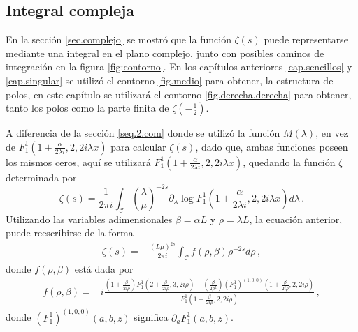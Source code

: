 \subsection{Integral compleja}\label{sec.finita.compleja}

En la sección \ref{sec.complejo} se mostró que la función $\zeta (s)$ puede representarse mediante una integral en el plano complejo, junto con posibles caminos de integración en la figura \ref{fig:contorno}. En los capítulos anteriores \ref{cap.sencillos}  y \ref{cap.singular} se utilizó el contorno \ref{fig.medio} para obtener, la estructura de polos, en este capítulo se utilizará el contorno \ref{fig.derecha.derecha} para obtener, tanto los polos como la parte finita  de  $\zeta \left( - \frac{1}{2} \right)$.

A diferencia de la sección \ref{seq.2.com} donde se utilizó la función $M (\lambda )$, en vez de $F _1 ^{1} \left( 1+\frac{ \alpha}{2 \lambda i },2,2 i \lambda x \right)$ para calcular $\zeta (s)$, dado que, ambas funciones poseen los mismos ceros, aquí se utilizará 
$F _1 ^{1} \left( 1+\frac{ \alpha}{2 \lambda i },2,2 i \lambda x \right)$, quedando la función $\zeta$ determinada por
\begin{equation}
	\zeta (s) = 
	\frac{1}{2 \pi i} \int _{\mathcal{C}} 
						\left( \frac{\lambda}{\mu} \right) ^{-2s}
						\partial _ \lambda 
						\log F _1 ^{1} 
						\left( 1+\frac{ \alpha}{2 \lambda i },
							2,2 i \lambda x 
							\right)												
						d \lambda
	\, .
\end{equation}
Utilizando las variables adimensionales $\beta = \alpha L$ y  $\rho = \lambda L$, la ecuación anterior, puede reescribirse de la forma
\begin{align}
\label{eq.ultima.int}
	\zeta (s) =& 
	\frac{\left(L \mu \right)^{2s}}{2 \pi i} \int _{\mathcal{C}} 
	f (\rho , \beta) \rho ^{-2s} d \rho 
\, ,
\end{align}
donde $f( \rho, \beta)$ está dada por
\begin{align}
f(\rho, \beta) =& 	
i
\frac{
		\left(1 + \frac{ \beta}{2 i \rho} \right) 
		F _1 ^1 
			\left( 2 + \frac{ \beta}{2 i \rho} ,3 ,2 i \rho \right)
		+ \left( \frac{\beta				
				}
				{2 \rho ^2 } 
				\right)
				( F _{1} ^1 ) ^{(1,0,0)}
				\left( 1 + \frac{\beta}{2 i \rho} ,2 ,2 i \rho
						\right)
		}
		{F _1 ^1 \left( 1 + \frac{\beta}{2 i \rho},2,2 i \rho \right)} 
\, ,	
\nonumber
\end{align}
donde $( F _{1} ^1 ) ^{(1,0,0)} (a,b,z)$ significa $ \partial _a F _{1} ^1  (a,b,z)$.


